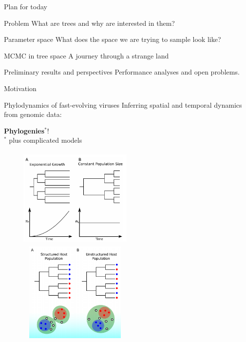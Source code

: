 \documentclass[newPxFont,numfooter,sectionpages]{beamer}
\begin{document}
\begin{frame}{Plan for today}
\begin{alertblock}{Problem}
What are trees and why are interested in them?
\end{alertblock}%
\begin{exampleblock}{Parameter space}
What does the space we are trying to sample look like?
\end{exampleblock}%
\begin{block}{MCMC in tree space}
 A journey through a strange land
\end{block}%
\begingroup
{}
\begin{block}{Preliminary results and perspectives}
Performance analyses and open problems.
\end{block}
\endgroup
\end{frame}

\begingroup
\begin{frame}{Motivation}
\begin{block}{Phylodynamics of fast-evolving viruses}
 Inferring spatial and temporal dynamics from genomic data:
 \begin{center}
  \Large \textbf{Phylogenies}$^\ast$! \\
  \tiny $^\ast$ plus complicated models
 \end{center}
\end{block}
\begin{figure}
	\centerline{
	\includegraphics[width=0.5\textwidth,height=5cm]{figures/pop_growth.jpg}  
	\includegraphics[width=0.5\textwidth,height=5cm]{figures/pop_structure.jpg}
	}
\end{figure}
\end{frame}
\endgroup
\end{document}

